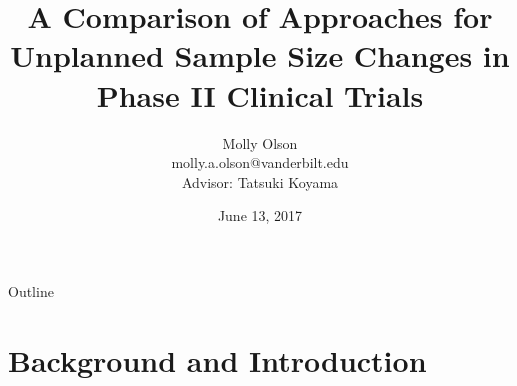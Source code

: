 \documentclass{beamer}\usepackage[]{graphicx}\usepackage[]{color}
\title[]{A Comparison of Approaches for Unplanned Sample Size Changes in Phase II Clinical Trials}
\author{Molly Olson \\ \small molly.a.olson@vanderbilt.edu \\ Advisor: Tatsuki Koyama}
\institute{Vanderbilt University \\ Department Of Biostatistics}
\date{June 13, 2017}
\begin{document}
\frame{\titlepage}


\begin{frame}{Outline}
  \tableofcontents
\end{frame}

% 

\section{Background and Introduction}
\end{document}
